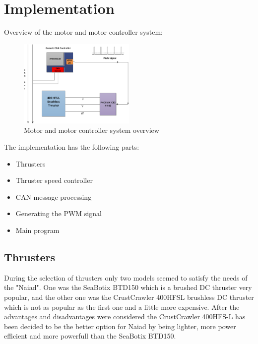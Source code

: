 \section{Implementation}\label{sec:implementation}
Overview of the motor and motor controller system:
\begin{figure}[h]
    \includegraphics[width=0.5\textwidth]{./figure/figA.png}
    \caption{Motor and motor controller system overview}
    \label{fig:one_column_figure}
\end{figure}

The implementation has the following parts:
\begin{itemize}
\item Thrusters
\item Thruster speed controller
 \item CAN message processing
 \item Generating the PWM signal
 \item Main program 
\end{itemize}

\subsection{Thrusters}
During the selection of thrusters only two models seemed to satisfy the needs of the "Naiad". One was the SeaBotix BTD150 which is a brushed DC thruster very popular, and the other one was the CrustCrawler 400HFSL brushless DC thruster which is not as popular as the first one and a little more expensive. After the advantages and disadvantages were considered the CrustCrawler 400HFS-L has been decided to be the better option for Naiad by being lighter, more power efficient and more powerfull than the SeaBotix BTD150. 

